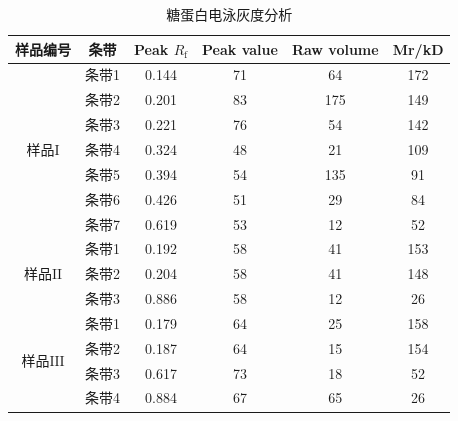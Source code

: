 \begin{table}[ht]
\centering
\caption{糖蛋白电泳灰度分析}
\label{tab:}
\begin{tabular}{@{}cccccc@{}}
\toprule
样品编号                                               & 条带  & Peak $R_\text{f}$ & Peak value & Raw volume & Mr/kD \\ \midrule
\multirow{7}{*}{样品$\mathrm{I}$}                               & 条带1 & 0.144   & 71         & 64         & 172   \\
                                                   & 条带2 & 0.201   & 83         & 175        & 149   \\
                                                   & 条带3 & 0.221   & 76         & 54         & 142   \\
                                                   & 条带4 & 0.324   & 48         & 21         & 109   \\
                                                   & 条带5 & 0.394   & 54         & 135        & 91    \\
                                                   & 条带6 & 0.426   & 51         & 29         & 84    \\
                                                   & 条带7 & 0.619   & 53         & 12         & 52    \\ \midrule
\multirow{3}{*}{样品$\mathrm{II}$}                               & 条带1 & 0.192   & 58         & 41         & 153   \\
                                                   & 条带2 & 0.204   & 58         & 41         & 148   \\
                                                   & 条带3 & 0.886   & 58         & 12         & 26    \\ \midrule
\multirow{4}{*}{样品$\mathrm{III}$}                               & 条带1 & 0.179   & 64         & 25         & 158   \\
                                                   & 条带2 & 0.187   & 64         & 15         & 154   \\
                                                   & 条带3 & 0.617   & 73         & 18         & 52    \\
                                                   & 条带4 & 0.884   & 67         & 65         & 26    \\ \midrule

\end{tabular}
\end{table}
